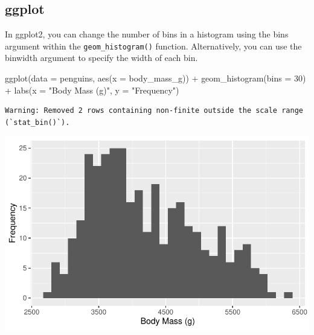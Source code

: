 \documentclass[
  letterpaper,
  DIV=11,
  numbers=noendperiod]{scrreprt}
\newenvironment{Shaded}{\begin{snugshade}}{\end{snugshade}}
\newcommand{\AttributeTok}[1]{\textcolor[rgb]{0.40,0.45,0.13}{#1}}
\newcommand{\DecValTok}[1]{\textcolor[rgb]{0.68,0.00,0.00}{#1}}
\newcommand{\FunctionTok}[1]{\textcolor[rgb]{0.28,0.35,0.67}{#1}}
\newcommand{\NormalTok}[1]{\textcolor[rgb]{0.00,0.23,0.31}{#1}}
\newcommand{\SpecialCharTok}[1]{\textcolor[rgb]{0.37,0.37,0.37}{#1}}
\newcommand{\StringTok}[1]{\textcolor[rgb]{0.13,0.47,0.30}{#1}}
\begin{document}
\begin{tcolorbox}[enhanced jigsaw, bottomtitle=1mm, bottomrule=.15mm, toprule=.15mm, opacityback=0, leftrule=.75mm, breakable, colback=white, toptitle=1mm, left=2mm, coltitle=black, titlerule=0mm, opacitybacktitle=0.6, title=\textcolor{quarto-callout-tip-color}{\faLightbulb}\hspace{0.5em}{How do we change bin widths for histograms?}, rightrule=.15mm, arc=.35mm, colframe=quarto-callout-tip-color-frame, colbacktitle=quarto-callout-tip-color!10!white]

\section{ggplot}

In ggplot2, you can change the number of bins in a histogram using the
bins argument within the \texttt{geom\_histogram()} function.
Alternatively, you can use the binwidth argument to specify the width of
each bin.

\begin{Shaded}
\begin{Highlighting}[]
\FunctionTok{ggplot}\NormalTok{(}\AttributeTok{data =}\NormalTok{ penguins, }\FunctionTok{aes}\NormalTok{(}\AttributeTok{x =}\NormalTok{ body\_mass\_g)) }\SpecialCharTok{+}
  \FunctionTok{geom\_histogram}\NormalTok{(}\AttributeTok{bins =} \DecValTok{30}\NormalTok{) }\SpecialCharTok{+}
  \FunctionTok{labs}\NormalTok{(}\AttributeTok{x =} \StringTok{"Body Mass (g)"}\NormalTok{, }\AttributeTok{y =} \StringTok{"Frequency"}\NormalTok{)}
\end{Highlighting}
\end{Shaded}

\begin{verbatim}
Warning: Removed 2 rows containing non-finite outside the scale range
(`stat_bin()`).
\end{verbatim}

\includegraphics{scripts/02_dataViz/class4_files/figure-pdf/widths2-1.pdf}


\end{tcolorbox}
\end{document}
